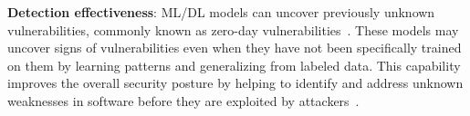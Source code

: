 \noindent \textbf{Detection effectiveness}: ML/DL models can uncover previously unknown vulnerabilities, commonly known as zero-day vulnerabilities~\cite{bilge2012before}. These models may uncover signs of vulnerabilities even when they have not been specifically trained on them by learning patterns and generalizing from labeled data. This capability improves the overall security posture by helping to identify and address unknown weaknesses in software before they are exploited by attackers~\cite{abri2019can}.






